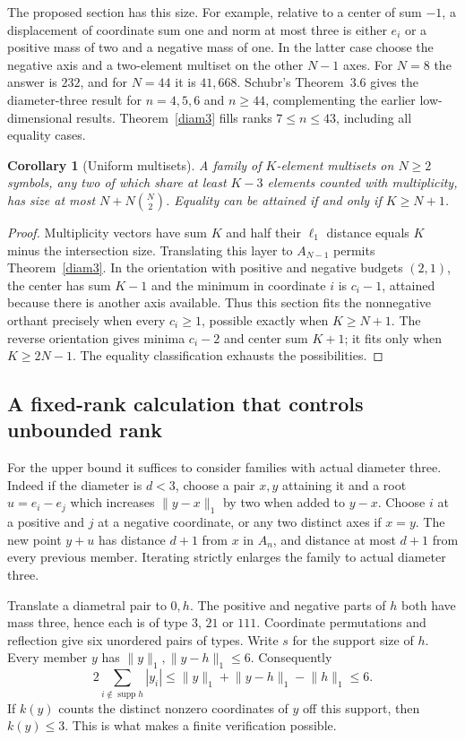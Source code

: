 \documentclass[10pt]{article}
\newtheorem{corollary}[theorem]{Corollary}
\newcommand{\norm}[1]{\lVert #1\rVert_1}
\begin{document}
The proposed section has this size. For example, relative to a center of sum $-1$, a displacement of coordinate sum one and norm at most three is either $e_i$ or a positive mass of two and a negative mass of one. In the latter case choose the negative axis and a two-element multiset on the other $N-1$ axes. For $N=8$ the answer is $232$, and for $N=44$ it is $41{,}668$. Schubr's Theorem~3.6 gives the diameter-three result for $n=4,5,6$ and $n\ge44$, complementing the earlier low-dimensional results. Theorem~\ref{diam3} fills ranks $7\le n\le43$, including all equality cases.

\begin{corollary}[Uniform multisets]
A family of $K$-element multisets on $N\ge2$ symbols, any two of which share at least $K-3$ elements counted with multiplicity, has size at most $N+N\binom N2$. Equality can be attained if and only if $K\ge N+1$.
\end{corollary}
\begin{proof}
Multiplicity vectors have sum $K$ and half their $\ell_1$ distance equals $K$ minus the intersection size. Translating this layer to $A_{N-1}$ permits Theorem~\ref{diam3}. In the orientation with positive and negative budgets $(2,1)$, the center has sum $K-1$ and the minimum in coordinate $i$ is $c_i-1$, attained because there is another axis available. Thus this section fits the nonnegative orthant precisely when every $c_i\ge1$, possible exactly when $K\ge N+1$. The reverse orientation gives minima $c_i-2$ and center sum $K+1$; it fits only when $K\ge2N-1$. The equality classification exhausts the possibilities.
\end{proof}

\subsection*{A fixed-rank calculation that controls unbounded rank}

For the upper bound it suffices to consider families with actual diameter three. Indeed if the diameter is $d<3$, choose a pair $x,y$ attaining it and a root $u=e_i-e_j$ which increases $\norm{y-x}$ by two when added to $y-x$. Choose $i$ at a positive and $j$ at a negative coordinate, or any two distinct axes if $x=y$. The new point $y+u$ has distance $d+1$ from $x$ in $A_n$, and distance at most $d+1$ from every previous member. Iterating strictly enlarges the family to actual diameter three.

Translate a diametral pair to $0,h$. The positive and negative parts of $h$ both have mass three, hence each is of type $3$, $21$ or $111$. Coordinate permutations and reflection give six unordered pairs of types. Write $s$ for the support size of $h$. Every member $y$ has $\norm y,\norm{y-h}\le6$. Consequently
\[
 2\sum_{i\notin\operatorname{supp}h}|y_i|
 \le \norm y+\norm{y-h}-\norm h\le6 .
\]
If $k(y)$ counts the distinct nonzero coordinates of $y$ off this support, then $k(y)\le3$. This is what makes a finite verification possible.
\end{document}
